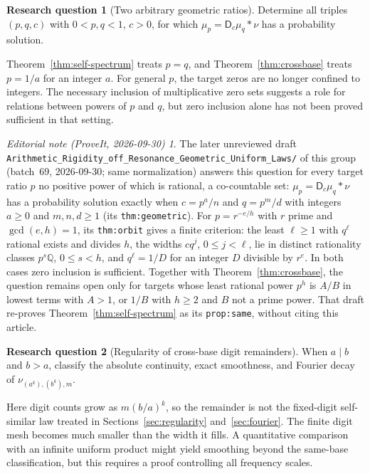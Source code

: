 \documentclass[11pt,a4paper]{article}
\theoremstyle{definition}
\newtheorem{question}{Research question}
\theoremstyle{remark}
\newtheorem*{ednotelater}{Editorial note (ProveIt, 2026-09-30)}
\newcommand{\D}{\mathsf D}
\begin{document}
\begin{question}[Two arbitrary geometric ratios]
Determine all triples $(p,q,c)$ with $0<p,q<1$, $c>0$, for which
$\mu_p=\D_c\mu_q*\nu$ has a probability solution.
\end{question}
Theorem~\ref{thm:self-spectrum} treats $p=q$, and
Theorem~\ref{thm:crossbase} treats $p=1/a$ for an integer $a$.
For general $p$, the target zeros are no longer confined to integers.
The necessary inclusion of multiplicative zero sets suggests a role for
relations between powers of $p$ and $q$, but zero inclusion alone has not
been proved sufficient in that setting.
\begin{ednotelater}
The later unreviewed draft
\nolinkurl{Arithmetic_Rigidity_off_Resonance_Geometric_Uniform_Laws/} of
this group (batch~69, 2026-09-30; same normalization) answers this
question for every target ratio $p$ no positive power of which is
rational, a co-countable set: $\mu_p=\D_c\mu_q*\nu$ has a probability
solution exactly when $c=p^a/n$ and $q=p^m/d$ with integers $a\ge0$ and
$m,n,d\ge1$ (its \texttt{thm:geometric}). For $p=r^{-e/h}$ with $r$ prime
and $\gcd(e,h)=1$, its \texttt{thm:orbit} gives a finite criterion: the
least $\ell\ge1$ with $q^\ell$ rational exists and divides $h$, the widths
$cq^j$, $0\le j<\ell$, lie in distinct rationality classes
$p^{s}\mathbb Q$, $0\le s<h$, and $q^\ell=1/D$ for an integer $D$ divisible by
$r^e$. In both cases zero inclusion is sufficient. Together with
Theorem~\ref{thm:crossbase}, the question remains open only for targets
whose least rational power $p^h$ is $A/B$ in lowest terms with $A>1$, or
$1/B$ with $h\ge2$ and $B$ not a prime power. That draft re-proves
Theorem~\ref{thm:self-spectrum} as its \texttt{prop:same}, without citing
this article.
\end{ednotelater}

\begin{question}[Regularity of cross-base digit remainders]
When $a\mid b$ and $b>a$, classify the absolute continuity, exact smoothness,
and Fourier decay of $\nu_{(a^k),(b^k),m}$.
\end{question}
Here digit counts grow as $m(b/a)^k$, so the remainder is not the
fixed-digit self-similar law treated in Sections~\ref{sec:regularity}
and~\ref{sec:fourier}. The finite digit mesh becomes much smaller than the
width it fills. A quantitative comparison with an infinite uniform product
might yield smoothing beyond the same-base classification, but this
requires a proof controlling all frequency scales.
\end{document}
